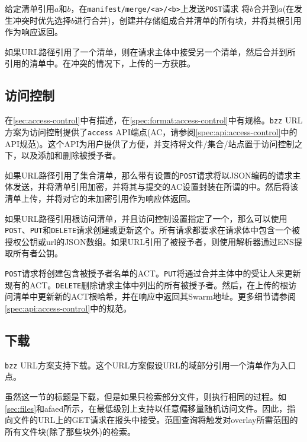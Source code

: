 给定清单引用$a$和$b$，在\lstinline{manifest/merge/<a>/<b>}上发送\lstinline{POST}请求
将$b$合并到$a$(在发生冲突时优先选择$b$进行合并)，创建并存储组成合并清单的所有块，并将其根引用作为响应返回。


如果URL路径引用了一个清单，则在请求主体中接受另一个清单，然后合并到所引用的清单中。在冲突的情况下，上传的一方获胜。 


\subsection{访问控制\statusgreen}\label{sec:access-control-ux}

在\ref{sec:access-control}中有描述，在\ref{spec:format:access-control}中有规格。\lstinline{bzz} URL方案为访问控制提供了\lstinline{access} API端点(AC，请参阅\ref{spec:api:access-control}中的API规范)。这个API为用户提供了方便，并支持将文件/集合/站点置于访问控制之下，以及添加和删除被授予者。

如果URL路径引用了集合清单，那么带有设置的\lstinline{POST}请求将以JSON编码的请求主体发送，并将清单引用加密，并将其与提交的AC设置封装在所谓的中。然后将该清单上传，并将对它的未加密引用作为响应体返回。

如果URL路径引用根访问清单，并且访问控制设置指定了一个，那么可以使用\lstinline{POST}、\lstinline{PUT}和\lstinline{DELETE}请求创建或更新这个。所有请求都要求在请求体中包含一个被授权公钥或url的JSON数组。如果URL引用了被授予者，则使用解析器通过ENS提取所有者公钥。

\lstinline{POST}请求将创建包含被授予者名单的ACT。\lstinline{PUT}将通过合并主体中的受让人来更新现有的ACT。\lstinline{DELETE}删除请求主体中列出的所有被授予者。然后，在上传的根访问清单中更新新的ACT根哈希，并在响应中返回其Swarm地址。更多细节请参阅\ref{spec:api:access-control}中的规范。



\subsection{下载\statusgreen}\label{sec:download}

\lstinline{bzz} URL方案支持下载。这个URL方案假设URL的域部分引用一个清单作为入口点。

虽然这一节的标题是下载，但是如果只检索部分文件，则执行相同的过程。如\ref{sec:files}和afaed所示，在最低级别上支持以任意偏移量随机访问文件。因此，指向文件的URL上的GET请求在报头中接受。范围查询将触发对overlay所需范围的所有文件块(除了那些块外)的检索。  

